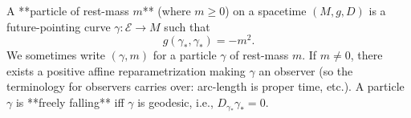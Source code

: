 A **particle of rest-mass $m$** (where $m \geq 0$) on a spacetime $(M, g, D)$ is a future-pointing curve $\gamma: \mathcal{E} \to M$ such that
$$g(\gamma_*, \gamma_*) = -m^2.$$
We sometimes write $(\gamma, m)$ for a particle $\gamma$ of rest-mass $m$. If $m \neq 0$, there exists a positive affine reparametrization making $\gamma$ an observer (so the terminology for observers carries over: arc-length is proper time, etc.). A particle $\gamma$ is **freely falling** iff $\gamma$ is geodesic, i.e., $D_{\gamma_*} \gamma_* = 0$.
